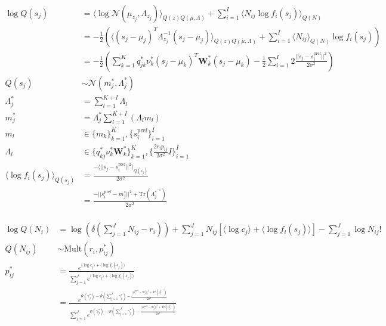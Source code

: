 \documentclass[12pt]{article}
\begin{document}
\\
\begin{equation}
\begin{aligned}
\log Q(s_j) &= \langle \log \mathcal{N}(\mu_{z_j}, \Lambda_{z_j}) \rangle_{Q(z)Q(\mu, \Lambda)} + \sum_{i=1}^I \langle N_{ij} \log f_i(s_j) \rangle_{Q(N)}\\
&= - \frac{1}{2} (\langle (s_j - \mu_j)^T \Lambda_{z_j}^{-1} (s_j - \mu_j) \rangle_{Q(z)Q(\mu, \Lambda)} + \sum_{i=1}^I \langle N_{ij} \rangle_{Q(N)} \log f_i(s_j))\\
&= - \frac{1}{2} (\sum_{k=1}^K q_{jk}^* \nu^*_k (s_j - \mu_k)^T \mathbf{W}^*_k (s_j - \mu_k) - \frac{1}{2} \sum_{i=1}^I 2 \frac{||s_j - s_i^{\text{pref}}||^2}{2 \sigma^2})\\
Q(s_j) &\sim \mathcal{N} (m^*_j, \Lambda^*_j)\\
\Lambda^*_j &= \sum_{l=1}^{K+I} \Lambda_l\\
m^*_j &= \Lambda^*_j \sum_{l=1}^{K+I} (\Lambda_l m_l)\\
m_l &\in \{m_k\}_{k=1}^K, \{s_i^{\text{pref}}\}_{i=1}^I\\
\Lambda_l &\in \{ q_{kj}^* \nu^*_k \mathbf{W}^*_k \}_{k=1}^K, \{\frac{2 r_i p_{ij}}{2 \sigma^2}I\}_{i=1}^I\\
\langle \log f_i(s_j) \rangle_{Q(s_j)} &= \frac{- \langle ||s_j - s_i^{\text{pref}}||^2 \rangle_{Q(s_j)}}{2 \sigma^2}\\
&=  \frac{-||s_i^{\text{pref}} - m_j^*||^2 + \text{Tr}(\Lambda_j^{*^{-1}})}{2 \sigma^2}
\end{aligned}
\end{equation}
\\
\begin{equation}
\begin{aligned}
\log Q(N_i) &= \log(\delta(\sum_{j=1}^J N_{ij} -r_i)) + \sum_{j=1}^J N_{ij}[\langle \log c_j \rangle + \langle \log f_i(s_j) \rangle] - \sum_{j=1}^J \log N_{ij}!\\
Q(N_{ij}) &\sim \text{Mult}(r_i, p^*_{ij})\\
p^*_{ij} &= \frac{e^{\langle \log c_j \rangle + \langle \log f_i(s_j) \rangle}}{\sum_{j=1}^J e^{\langle \log c_j \rangle + \langle \log f_i(s_j) \rangle}}\\
&= \frac{e^{\Psi(\gamma_j^*) - \Psi(\sum_{j=1}^J \gamma_j^*) - \frac{||s_i^{\text{pref}} - m_j^*||^2 + \text{Tr}(\Lambda_j^{*^{-1}})}{2 \sigma^2}}}{\sum_{j=1}^J e^{\Psi(\gamma_j^*) - \Psi(\sum_{j=1}^J \gamma_j^*)  - \frac{||s_i^{\text{pref}} - m_j^*||^2 + \text{Tr}(\Lambda_j^{*^{-1}})}{2 \sigma^2}}}
\end{aligned}
\end{equation}
\end{document}
